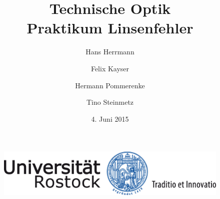 \documentclass[11pt,fleqn]{article}
\title{Technische Optik \\ Praktikum Linsenfehler}
\date{4. Juni 2015}
\author{Hans Herrmann \and Felix Kayser \and Hermann Pommerenke \and Tino Steinmetz}
\begin{document}
	\begin{figure}[t]
	    \centering
	    \includegraphics[width=115mm]{img/UNI-Logo_Siegel_4c_115mm_07.png}
	\end{figure}

	\maketitle
	
	\thispagestyle{empty}

	\newpage
	\pagestyle{headings}
	\tableofcontents
	
	\everymath{\displaystyle} %
	
	\newpage

	
	
	\clearpage
	
	
	\clearpage
	
	
	\clearpage
	\printbibliography
\end{document}
